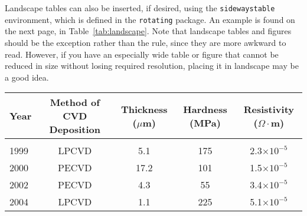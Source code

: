 Landscape tables can also be inserted, if desired, using the \verb-sidewaystable- environment, which is defined in the \verb!rotating! package. An example is found on the next page, in Table~\ref{tab:landscape}. Note that landscape tables and figures should be the exception rather than the rule, since they are more awkward to read. However, if you have an especially wide table or figure that cannot be reduced in size without losing required resolution, placing it in landscape may be a good idea.
\begin{sidewaystable}
\caption{A landscape table}\vspace*{6pt}
\label{tab:landscape}
\setlength{\tabcolsep}{6mm}
\begin{tabular}{lcccc}
Year & Method of CVD Deposition & Thickness ($\mu$m) & Hardness (MPa) & Resistivity ($\Omega\cdot$m)\\ 
\hline\\[-11pt]
1999 & LPCVD & 5.1 & 175 & 2.3$\times10^{-5}$\\
2000 & PECVD & 17.2 & 101& 1.5$\times10^{-5}$\\
2002 & PECVD & 4.3 & 55 & 3.4$\times10^{-5}$\\
2004 & LPCVD & 1.1 & 225 & 5.1$\times10^{-5}$\\
\hline
\end{tabular} 
\end{sidewaystable}